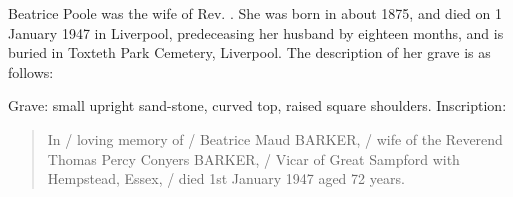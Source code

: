 
Beatrice Poole was the wife of Rev. .
She was born in about 1875, and died on 1 January 1947 in Liverpool, predeceasing her husband by eighteen months, and is buried in Toxteth Park Cemetery, Liverpool.  The description of her grave is as follows:

Grave: small upright sand-stone, curved top, raised square shoulders.\cite{ToxtethParkCemeteryInscriptions} Inscription:
\begin{quotation}
In / loving memory of / Beatrice Maud BARKER, / wife of the Reverend Thomas Percy Conyers BARKER, / Vicar of Great Sampford with Hempstead, Essex, / died 1st January 1947 aged 72 years.
\end{quotation}

% 
% 
% 
% 
% 
% 
% 
%  	 	 	 	 	 	 	 	 	 	 	 
% 
% 
